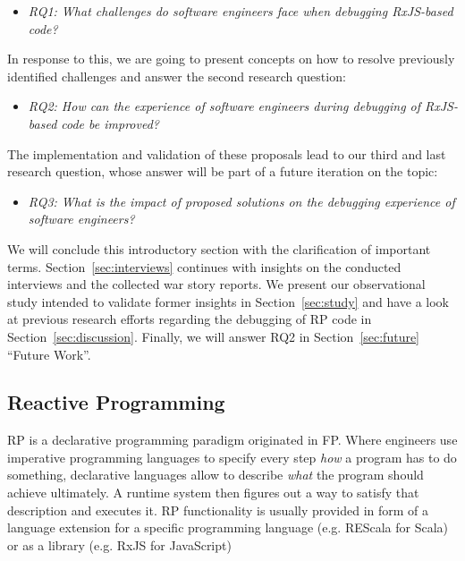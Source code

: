 \documentclass[12pt,a4paper]{article}
\begin{document}
\begin{itemize}
	\item \emph{RQ1: What challenges do software engineers face when debugging RxJS-based code?}
\end{itemize}

In response to this, we are going to present concepts on how to resolve previously identified challenges and answer the second research question:

\begin{itemize}
	\item \emph{RQ2: How can the experience of software engineers during debugging of RxJS-based code be improved?}
\end{itemize}

The implementation and validation of these proposals lead to our third and last research question, whose answer will be part of a future iteration on the topic:

\begin{itemize}
	\item \emph{RQ3: What is the impact of proposed solutions on the debugging experience of software engineers?}
\end{itemize}

We will conclude this introductory section with the clarification of important terms. Section~\ref{sec:interviews} continues with insights on the conducted interviews and the collected war story reports. We present our observational study intended to validate former insights in Section~\ref{sec:study} and have a look at previous research efforts regarding the debugging of RP code in Section~\ref{sec:discussion}. Finally, we will answer RQ2 in Section~\ref{sec:future} ``Future Work''.

\subsection{Reactive Programming}

RP is a declarative programming paradigm originated in FP. Where engineers use imperative programming languages to specify every step \emph{how} a program has to do something, declarative languages allow to describe \emph{what} the program should achieve ultimately. A runtime system then figures out a way to satisfy that description and executes it. RP functionality is usually provided in form of a language extension for a specific programming language (e.g. REScala for Scala\cite{10.1145/2577080.2577083}) or as a library (e.g. RxJS for JavaScript\cite{rxjs})
\end{document}
